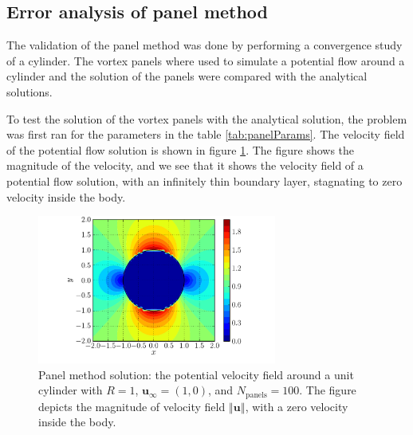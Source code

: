 \subsection{Error analysis of panel method}
The validation of the panel method was done by performing a convergence study of a cylinder. The vortex panels where used to simulate a potential flow around a cylinder and the solution of the panels were compared with the analytical solutions.


To test the solution of the vortex panels with the analytical solution, the problem was first ran for the parameters in the table \ref{tab:panelParams}. The velocity field of the potential flow solution is shown in figure \ref{fig:panelCylinder_velocityField}. The figure shows the magnitude of the velocity, and we see that it shows the velocity field of a potential flow solution, with an infinitely thin boundary layer, stagnating to zero velocity inside the body.

	\begin{figure}[!t]
	\centering
	\includegraphics[width=0.7\textwidth]{figures/lagrangian/panelCylinder_velocityField.pdf}
	\caption{Panel method solution: the potential velocity field around a unit cylinder with $R = 1$, $\mathbf{u}_{\infty} = (1, 0)$, and $N_{\mathrm{panels}}=100$. The figure depicts the magnitude of velocity field $\left\Vert\mathbf{u}\right\Vert$, with a zero velocity inside the body.}
	\label{fig:panelCylinder_velocityField}
	\end{figure}

